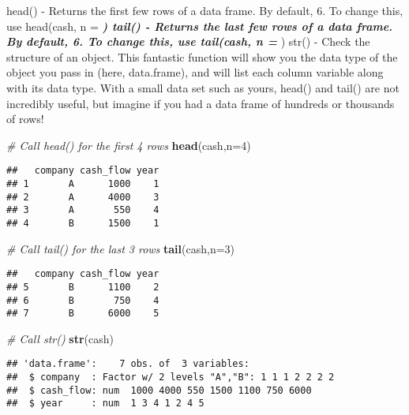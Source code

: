 \documentclass[]{article}
\newenvironment{Shaded}{\begin{snugshade}}{\end{snugshade}}
\newcommand{\KeywordTok}[1]{\textcolor[rgb]{0.13,0.29,0.53}{\textbf{#1}}}
\newcommand{\DataTypeTok}[1]{\textcolor[rgb]{0.13,0.29,0.53}{#1}}
\newcommand{\DecValTok}[1]{\textcolor[rgb]{0.00,0.00,0.81}{#1}}
\newcommand{\CommentTok}[1]{\textcolor[rgb]{0.56,0.35,0.01}{\textit{#1}}}
\newcommand{\NormalTok}[1]{#1}
\begin{document}
head() - Returns the first few rows of a data frame. By default, 6. To
change this, use head(cash, n = \textbf{\emph{) tail() - Returns the
last few rows of a data frame. By default, 6. To change this, use
tail(cash, n = }}) str() - Check the structure of an object. This
fantastic function will show you the data type of the object you pass in
(here, data.frame), and will list each column variable along with its
data type. With a small data set such as yours, head() and tail() are
not incredibly useful, but imagine if you had a data frame of hundreds
or thousands of rows!

\begin{Shaded}
\begin{Highlighting}[]
\CommentTok{# Call head() for the first 4 rows}
\KeywordTok{head}\NormalTok{(cash,}\DataTypeTok{n=}\DecValTok{4}\NormalTok{)}
\end{Highlighting}
\end{Shaded}

\begin{verbatim}
##   company cash_flow year
## 1       A      1000    1
## 2       A      4000    3
## 3       A       550    4
## 4       B      1500    1
\end{verbatim}

\begin{Shaded}
\begin{Highlighting}[]
\CommentTok{# Call tail() for the last 3 rows}
\KeywordTok{tail}\NormalTok{(cash,}\DataTypeTok{n=}\DecValTok{3}\NormalTok{)}
\end{Highlighting}
\end{Shaded}

\begin{verbatim}
##   company cash_flow year
## 5       B      1100    2
## 6       B       750    4
## 7       B      6000    5
\end{verbatim}

\begin{Shaded}
\begin{Highlighting}[]
\CommentTok{# Call str()}
\KeywordTok{str}\NormalTok{(cash)}
\end{Highlighting}
\end{Shaded}

\begin{verbatim}
## 'data.frame':    7 obs. of  3 variables:
##  $ company  : Factor w/ 2 levels "A","B": 1 1 1 2 2 2 2
##  $ cash_flow: num  1000 4000 550 1500 1100 750 6000
##  $ year     : num  1 3 4 1 2 4 5
\end{verbatim}
\end{document}
